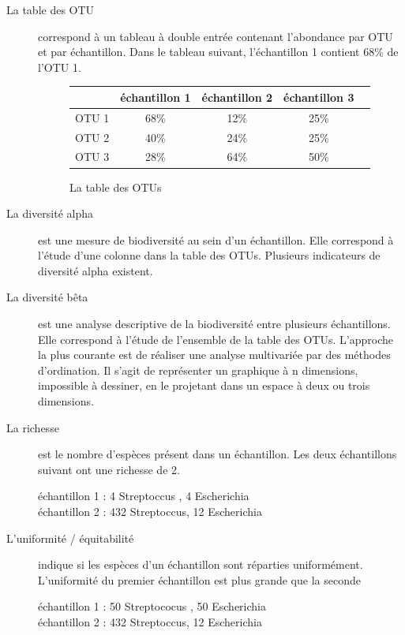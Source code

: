 \documentclass[12pt,a4paper]{article}
\begin{document}
\begin{description}
\item[La table des OTU] correspond à un tableau à double entrée contenant l’abondance par OTU  et par échantillon. Dans le tableau suivant, l'échantillon 1 contient 68\% de l'OTU 1.

\begin{figure}
\begin{center}
\begin{tabular}{|l|c|c|c|c}
  \hline
   & échantillon 1 & échantillon 2 & échantillon 3  \\
  \hline
  OTU 1 & 68\% & 12\% & 25\% \\
  OTU 2 & 40\% & 24\% & 25\% \\
  OTU 3 & 28\% & 64\% & 50\% \\

  \hline
\end{tabular}
\end{center}
\caption{La table des OTUs}
\end{figure}

\item[La diversité alpha] est une mesure de biodiversité au sein d’un échantillon. Elle correspond à l’étude d’une colonne dans la table des OTUs. Plusieurs indicateurs de diversité alpha existent.

\item[La diversité bêta] est une analyse descriptive de la biodiversité entre plusieurs échantillons. Elle correspond à l’étude de l’ensemble de la table des OTUs. L’approche la plus courante est de réaliser une analyse multivariée par des méthodes d’ordination. Il s’agit de représenter un graphique à n dimensions, impossible à dessiner, en le projetant dans un espace à deux ou trois dimensions.

\item[La richesse] est le nombre d’espèces présent dans un échantillon. Les deux échantillons suivant ont une richesse de 2.

échantillon 1  : 4 Streptoccus , 4 Escherichia  \\ 
échantillon 2 : 432 Streptoccus, 12 Escherichia 

\item[L'uniformité / équitabilité] indique si les espèces d’un échantillon sont réparties uniformément.
L'uniformité du premier échantillon est plus grande que la seconde

échantillon 1  : 50 Streptococus , 50 Escherichia  \\ 
échantillon 2 : 432 Streptoccus, 12 Escherichia 



\end{description}
\end{document}
